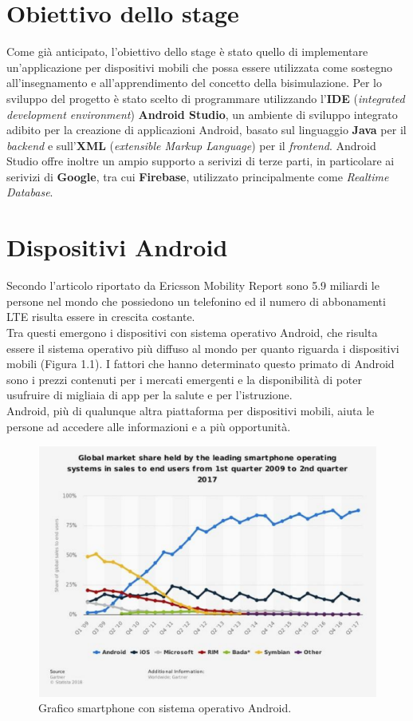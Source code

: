\documentclass[a4paper,11pt,twoside,openright]{report}
\begin{document}
\section*{Obiettivo dello stage}
Come già anticipato, l'obiettivo dello stage è stato quello di implementare un'applicazione per dispositivi mobili che possa essere utilizzata come sostegno all'insegnamento e all'apprendimento del concetto della bisimulazione. Per lo sviluppo del progetto è stato scelto di programmare utilizzando l'\textbf{IDE} (\textit{integrated development environment})  \textbf{Android Studio}, un ambiente di sviluppo integrato adibito per la creazione di applicazioni Android, basato sul linguaggio \textbf{Java} per il \textit{backend} e sull'\textbf{XML} (\textit{extensible Markup Language}) per il \textit{frontend}. Android Studio offre inoltre un ampio supporto a serivizi di terze parti, in particolare ai serivizi di \textbf{Google}, tra cui \textbf{Firebase}, utilizzato principalmente come \textit{Realtime Database}.

\section*{Dispositivi Android}
Secondo l'articolo riportato da Ericsson Mobility Report \cite{2} sono 5.9 miliardi le persone nel mondo che possiedono un telefonino ed il numero di abbonamenti LTE risulta essere in crescita costante.\\
Tra questi emergono i dispositivi con sistema operativo Android, che risulta essere il sistema operativo più diffuso al mondo per quanto riguarda i dispositivi mobili (Figura 1.1). I fattori che hanno determinato questo primato di Android sono i prezzi contenuti per i mercati emergenti e la disponibilità di poter usufruire di migliaia di app per la salute e per l'istruzione.\\
Android, più di qualunque altra piattaforma per dispositivi mobili, aiuta le persone ad accedere alle informazioni e a più opportunità.

\begin{figure}[h]
\includegraphics[width=\textwidth]{images/Smartphone Android.png}
\caption{Grafico smartphone con sistema operativo Android.}
\end{figure}
\end{document}
